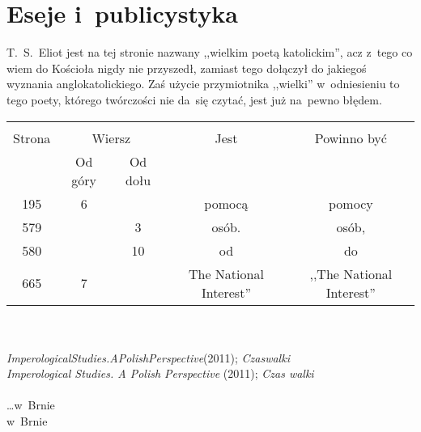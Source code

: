 \documentclass[a4paper,11pt]{article}
\begin{document}
\vspace{\spaceTwo}





\section{Eseje i~publicystyka}

\vspace{\spaceTwo}






\start {} T.~S.~Eliot jest na tej stronie nazwany ,,wielkim
poetą katolickim'', acz z~tego co wiem do Kościoła nigdy nie
przyszedł, zamiast tego dołączył do jakiegoś wyznania
anglokatolickiego. Zaś użycie przymiotnika ,,wielki'' w~odniesieniu to
tego poety, którego twórczości nie da~się czytać, jest już na~pewno
błędem.

\vspace{\spaceTwo}







\begin{center}
  \begin{tabular}{|c|c|c|c|c|}
    \hline
    & \multicolumn{2}{c|}{} & & \\
    Strona & \multicolumn{2}{c|}{Wiersz} & Jest
                              & Powinno być \\ \cline{2-3}
    & Od góry & Od dołu & & \\
    \hline
    195 &  6 & & pomocą & pomocy \\
    579 & &  3 & osób. & osób, \\
    580 & & 10 & od & do \\
    665 &  7 & & The National Interest'' & ,,The National Interest'' \\
    \hline
  \end{tabular}
\end{center}
\noi \\
 \\
\Jest \emph{ImperologicalStudies.APolishPerspective}(2011);
\emph{Czaswalki} \\
\Powin \emph{Imperological Studies. A Polish Perspective} (2011);
\emph{Czas walki} \\
 \\
\Jest \ldots w~Brnie \\
\Powin  w~Brnie \\
\end{document}
